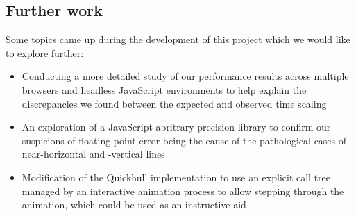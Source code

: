 \documentclass[11pt]{article}
\begin{document}
\subsection{Further work}
Some topics came up during the development of this project which we would like to explore further:

\begin{itemize}
\item
Conducting a more detailed study of our performance results across multiple browsers and headless JavaScript environments to help explain the discrepancies we found between the expected and observed time scaling
\item
An exploration of a JavaScript abritrary precision library to confirm our suspicions of floating-point error being the cause of the pathological cases of near-horizontal and -vertical lines
\item
Modification of the Quickhull implementation to use an explicit call tree managed by an interactive animation process to allow stepping through the animation, which could be used as an instructive aid
\end{itemize}

\nocite{Princeton:QH}
\nocite{CLRS}



\end{document}
